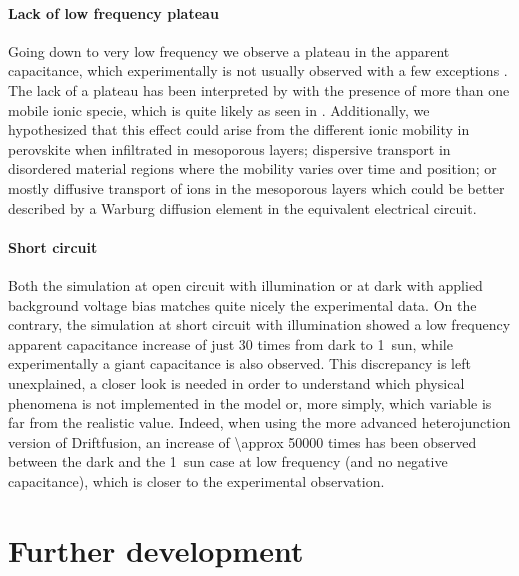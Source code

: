 		\paragraph{Lack of low frequency plateau}
		Going down to very low frequency we observe a plateau in the apparent capacitance, which experimentally is not usually observed \cite{Juarez-Perez2014} with a few exceptions \cite{Ebadi2019}.
		The lack of a plateau has been interpreted by  with the presence of more than one mobile ionic specie, which is quite likely as seen in .
		Additionally, we hypothesized \cite{Moia2019} that this effect could arise from the different ionic mobility in perovskite when infiltrated in mesoporous layers; dispersive transport in disordered material regions \cite{Schwarz1998} where the mobility varies over time and position; or mostly diffusive transport of ions in the mesoporous layers which could be better described by a Warburg diffusion element in the equivalent electrical circuit.
		

		\paragraph{Short circuit}
		Both the simulation at open circuit with illumination or at dark with applied background voltage bias matches quite nicely the experimental data.
		On the contrary, the simulation at short circuit with illumination showed a low frequency apparent capacitance increase of just 30 times from dark to 1~sun, while experimentally a giant capacitance is also observed.
		This discrepancy is left unexplained, a closer look is needed in order to understand which physical phenomena is not implemented in the model or, more simply, which variable is far from the realistic value.
		Indeed, when using the more advanced heterojunction version of Driftfusion, an increase of \num{\approx 50000} times has been observed between the dark and the \SI{1}{sun} case at low frequency (and no negative capacitance), which is closer to the experimental observation.



\section{Further development}


